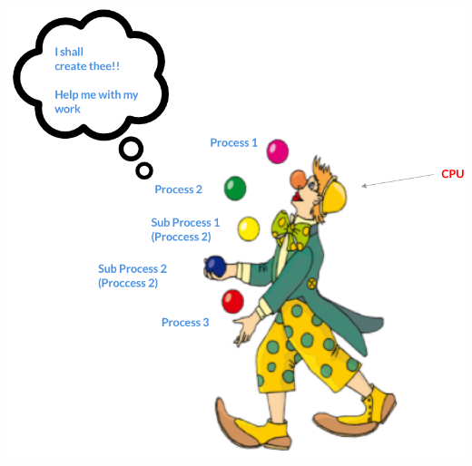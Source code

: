 \documentclass[12pt]{article}
\begin{document}
\begin{itemize}
\begin{itemize}
\begin{itemize}
            \begin{center}
            \includegraphics[width=\linewidth]{images/week_1_notes_1_9.png}
            \end{center}
        \end{itemize}


\end{itemize}
\end{itemize}
\end{document}
